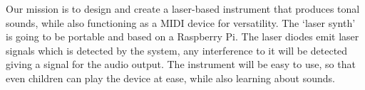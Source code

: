 Our mission is to design and create a laser-based instrument that produces tonal sounds, while also functioning as a MIDI device for versatility. The ‘laser synth’ is going to be portable and based on a Raspberry Pi. The laser diodes emit laser signals which is detected by the system, any interference to it will be detected giving a signal for the audio output. The instrument will be easy to use, so that even children can play the device at ease, while also learning about sounds.
